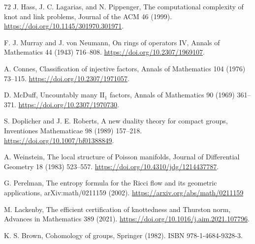 \documentclass[11pt,letterpaper]{article}
\theoremstyle{definition}
\begin{document}
\begin{thebibliography}{72}
 J. Hass, J. C. Lagarias, and N. Pippenger, The computational complexity of knot and link problems, Journal of the ACM 46 (1999). \url{https://doi.org/10.1145/301970.301971}.



 F. J. Murray and J. von Neumann, On rings of operators IV, Annals of Mathematics 44 (1943) 716--808. \url{https://doi.org/10.2307/1969107}.


 A. Connes, Classification of injective factors, Annals of Mathematics 104 (1976) 73--115. \url{https://doi.org/10.2307/1971057}.

 D. McDuff, Uncountably many $\mathrm{II}_1$ factors, Annals of Mathematics 90 (1969) 361--371. \url{https://doi.org/10.2307/1970730}.


 S. Doplicher and J. E. Roberts, A new duality theory for compact groups, Inventiones Mathematicae 98 (1989) 157--218. \url{https://doi.org/10.1007/bf01388849}.

 A. Weinstein, The local structure of Poisson manifolds, Journal of Differential Geometry 18 (1983) 523--557. \url{https://doi.org/10.4310/jdg/1214437787}.


 G. Perelman, The entropy formula for the Ricci flow and its geometric applications, arXiv:math/0211159 (2002). \url{https://arxiv.org/abs/math/0211159}


 M. Lackenby, The efficient certification of knottedness and Thurston norm, Advances in Mathematics 389 (2021). \url{https://doi.org/10.1016/j.aim.2021.107796}.

 K. S. Brown, Cohomology of groups, Springer (1982). ISBN 978-1-4684-9328-3.

\end{thebibliography}
\end{document}
